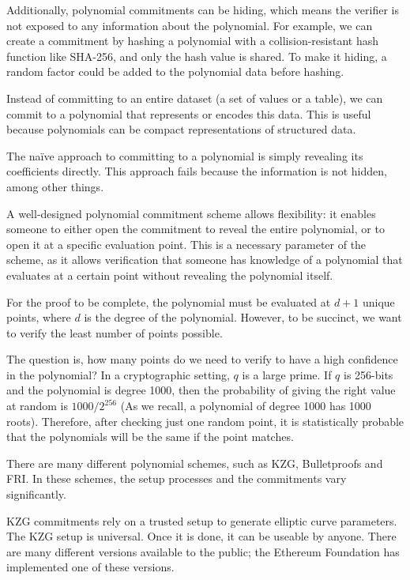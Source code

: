 Additionally, polynomial commitments can be hiding, which means the verifier is not exposed to any information about the polynomial.
For example, we can create a commitment by hashing a polynomial with a collision-resistant hash function like SHA-256, and only the hash value is shared. 
To make it hiding, a random factor could be added to the polynomial data before hashing.

Instead of committing to an entire dataset (a set of values or a table), we can commit to a polynomial that represents or encodes this data. 
This is useful because polynomials can be compact representations of structured data.

The naïve approach to committing to a polynomial is simply revealing its coefficients directly.
This approach fails because the information is not hidden, among other things.

A well-designed polynomial commitment scheme allows flexibility: it enables someone to either open the commitment to reveal the entire polynomial,
or to open it at a specific evaluation point. 
This is a necessary parameter of the scheme, as it allows verification that someone has knowledge of a polynomial that evaluates at a certain point without revealing the polynomial itself.

For the proof to be complete, the polynomial must be evaluated at $d+1$ unique points, where $d$ is the degree of the polynomial.
However, to be succinct, we want to verify the least number of points possible.

The question is, how many points do we need to verify to have a high confidence in the polynomial?
In a cryptographic setting, $q$ is a large prime. If $q$ is 256-bits and the polynomial is degree 1000, 
then the probability of giving the right value at random is $1000/2^{256}$ (As we recall, a polynomial of degree 1000 has 1000 roots). 
Therefore, after checking just one random point, it is statistically probable that the polynomials will be the same if the point matches. \cite{VR23}

There are many different polynomial schemes, such as KZG, Bulletproofs and FRI. 
In these schemes, the setup processes and the commitments vary significantly. 

KZG commitments rely on a trusted setup to generate elliptic curve parameters\cite{KZG}. The KZG setup is universal. Once it is done, it can be useable by anyone. 
There are many different versions available to the public; the Ethereum Foundation has implemented one of these versions. 

